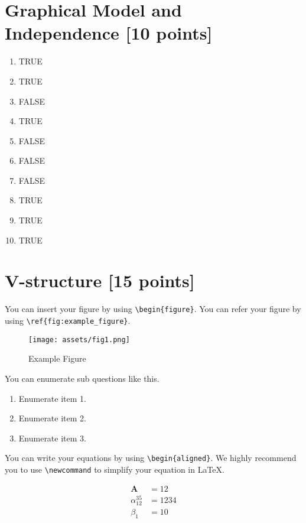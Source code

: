 \documentclass[12pt,a4paper]{article}
\newcommand{\Ab}{\bm{A}}
\begin{document}
\section{Graphical Model and Independence [10 points]}

\begin{enumerate}
  \item TRUE
  \item TRUE
  \item FALSE
  \item TRUE
  \item FALSE
  \item FALSE
  \item FALSE
  \item TRUE
  \item TRUE
  \item TRUE
\end{enumerate}

\section{V-structure [15 points]}



You can insert your figure by using \verb|\begin{figure}|.
You can refer your figure by using \verb|\ref{fig:example_figure}|.

\begin{figure}[!h]
    \begin{center}
        \texttt{[image: assets/fig1.png]}
        \caption{Example Figure}
        \label{fig:example_figure}
    \end{center}
\end{figure}

You can enumerate sub questions like this.

\begin{enumerate}
    \item Enumerate item 1.
    \item Enumerate item 2.
    \item Enumerate item 3.
\end{enumerate}

You can write your equations by using \verb|\begin{aligned}|.
We highly recommend you to use \verb|\newcommand| to simplify your equation in \LaTeX.

\begin{align}
    \Ab &= 12 \\
    \alpha_{12}^{35} &= 1234 \\
    \beta_1 &= 10
\end{align}
\end{document}
